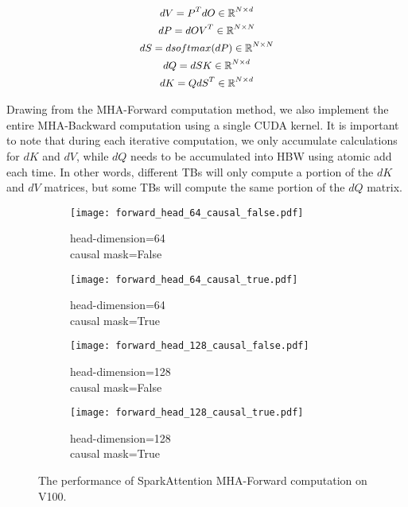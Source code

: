 \documentclass[10pt,twocolumn]{article}
\begin{document}
\begin{equation} \small \label{equ:backward}
\begin{gathered}
     dV=P^TdO \in \mathbb{R}^{N \times d}\\
     dP=dOV^T \in \mathbb{R}^{N \times N}\\
     dS=dsoftmax(dP) \in \mathbb{R}^{N \times N}\\
     dQ=dSK \in \mathbb{R}^{N \times d}\\
     dK=QdS^T \in \mathbb{R}^{N \times d}\\
\end{gathered}
\end{equation}

Drawing from the MHA-Forward computation method, we also implement the entire MHA-Backward computation using a single CUDA kernel.
It is important to note that during each iterative computation, we only accumulate calculations for $dK$ and $dV$, while $dQ$ needs to be accumulated into HBW using atomic add each time.
In other words, different TBs will only compute a portion of the $dK$ and $dV$ matrices, but
some TBs will compute the same portion of the $dQ$ matrix.
\begin{figure*}[t] \small
    \centering
    \begin{subfigure}[b]{0.24\textwidth}
        \texttt{[image: forward\_head\_64\_causal\_false.pdf]}
        \caption{head-dimension=64 \\ causal mask=False}
        \label{fig:subfig_forward-a}
    \end{subfigure}
    \hspace{0.0cm} %
    \begin{subfigure}[b]{0.24\textwidth}
        \texttt{[image: forward\_head\_64\_causal\_true.pdf]}
        \caption{head-dimension=64 \\ causal mask=True}
        \label{fig:subfig_forward-b}
    \end{subfigure}
    \hspace{0.0cm}
    \begin{subfigure}[b]{0.24\textwidth}
        \texttt{[image: forward\_head\_128\_causal\_false.pdf]}
        \caption{head-dimension=128 \\ causal mask=False}
        \label{fig:subfig_forward-c}
    \end{subfigure}
    \hspace{0.0cm}
    \begin{subfigure}[b]{0.24\textwidth}
        \texttt{[image: forward\_head\_128\_causal\_true.pdf]}
        \caption{head-dimension=128 \\ causal mask=True}
        \label{fig:subfig_forward-d}
    \end{subfigure}
    \caption{The performance of SparkAttention MHA-Forward computation on V100.}
    \label{fig:subfig_forward}
\end{figure*}
\end{document}

